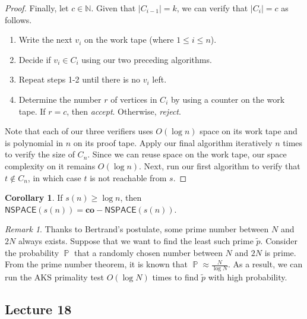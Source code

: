 \documentclass[10pt,letterpaper,cm]{nupset}
\theoremstyle{definition}
\theoremstyle{theorem}
\newtheorem{corollary}[definition]{Corollary}
\theoremstyle{remark}
\newtheorem{remark}[definition]{Remark}
\newcommand{\N}{\mathbb N}
\newcommand{\1}{\mathbf{1}}
\newcommand{\0}{\vec 0}
\DeclareMathOperator{\pr}{\mathbb{P}}
\begin{document}
\begin{proof}
\smallskip

Finally, let $c\in \N$. Given that $\left\lvert{C_{i-1}}\right\rvert=k$, we can verify that $\left\lvert{C_i}\right\rvert = c$ as follows. 
\begin{enumerate} 
\item Write the next $v_i$ on the work tape (where $1\leq i \leq n$). 
\item Decide if $v_i \in C_i$ using our two preceding algorithms.
\item Repeat steps 1-2 until there is no $v_i$ left.
\item Determine the number $r$ of vertices in $C_i$ by using a counter on the work tape. If $r = c$, then \textit{accept}. Otherwise, \textit{reject}.
\end{enumerate}

Note that each of our three verifiers uses $O(\log{n})$ space on its work tape and  is polynomial in $n$ on its proof tape. Apply our final algorithm iteratively $n$ times to verify the size of  $C_n$. Since we can reuse space on the work tape, our space complexity on it remains $O(\log{n})$.  Next, run our first algorithm to verify that $t\notin C_n$, in which case $t$ is not reachable from $s$.
\end{proof}

\begin{corollary}
If $s(n) \geq \log{n}$, then $\mathsf{NSPACE}(s(n)) = \mathbf{co}{-}\mathsf{NSPACE}(s(n))$.
\end{corollary}

\bigskip

\begin{remark}
Thanks to Bertrand's postulate, some prime number between $N$ and $2N$ always exists.  Suppose that we want to find the least such prime $\tilde{p}$. Consider the probability $\pr$ that a randomly chosen number between $N$ and $2N$ is prime. From the prime number theorem, it is known that $\pr \approx \frac{N}{\log{N}}$. As a result, we can run the AKS primality test $O(\log{N})$ times to find $\tilde{p}$ with high probability.
\end{remark}

\subsection{Lecture 18}
\end{document}
